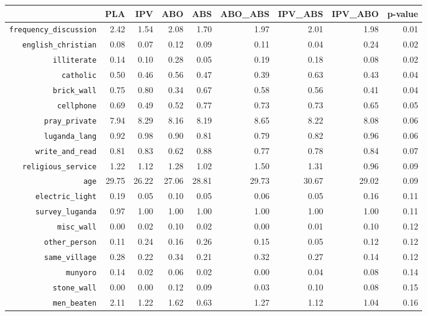 \begin{longtable}{rrrrrrrrr}
  \hline
 & PLA & IPV & ABO & ABS & ABO\_ABS & IPV\_ABS & IPV\_ABO & p-value \\ 
  \hline
{\texttt{frequency\_discussion}} & 2.42 & 1.54 & 2.08 & 1.70 & 1.97 & 2.01 & 1.98 & 0.01 \\ 
  {\texttt{english\_christian}} & 0.08 & 0.07 & 0.12 & 0.09 & 0.11 & 0.04 & 0.24 & 0.02 \\ 
  {\texttt{illiterate}} & 0.14 & 0.10 & 0.28 & 0.05 & 0.19 & 0.18 & 0.08 & 0.02 \\ 
  {\texttt{catholic}} & 0.50 & 0.46 & 0.56 & 0.47 & 0.39 & 0.63 & 0.43 & 0.04 \\ 
  {\texttt{brick\_wall}} & 0.75 & 0.80 & 0.34 & 0.67 & 0.58 & 0.56 & 0.41 & 0.04 \\ 
  {\texttt{cellphone}} & 0.69 & 0.49 & 0.52 & 0.77 & 0.73 & 0.73 & 0.65 & 0.05 \\ 
  {\texttt{pray\_private}} & 7.94 & 8.29 & 8.16 & 8.19 & 8.65 & 8.22 & 8.08 & 0.06 \\ 
  {\texttt{luganda\_lang}} & 0.92 & 0.98 & 0.90 & 0.81 & 0.79 & 0.82 & 0.96 & 0.06 \\ 
  {\texttt{write\_and\_read}} & 0.81 & 0.83 & 0.62 & 0.88 & 0.77 & 0.78 & 0.84 & 0.07 \\ 
  {\texttt{religious\_service}} & 1.22 & 1.12 & 1.28 & 1.02 & 1.50 & 1.31 & 0.96 & 0.09 \\ 
  {\texttt{age}} & 29.75 & 26.22 & 27.06 & 28.81 & 29.73 & 30.67 & 29.02 & 0.09 \\ 
  {\texttt{electric\_light}} & 0.19 & 0.05 & 0.10 & 0.05 & 0.06 & 0.05 & 0.16 & 0.11 \\ 
  {\texttt{survey\_luganda}} & 0.97 & 1.00 & 1.00 & 1.00 & 1.00 & 1.00 & 1.00 & 0.11 \\ 
  {\texttt{misc\_wall}} & 0.00 & 0.02 & 0.10 & 0.02 & 0.00 & 0.01 & 0.10 & 0.12 \\ 
  {\texttt{other\_person}} & 0.11 & 0.24 & 0.16 & 0.26 & 0.15 & 0.05 & 0.12 & 0.12 \\ 
  {\texttt{same\_village}} & 0.28 & 0.22 & 0.34 & 0.21 & 0.32 & 0.27 & 0.14 & 0.12 \\ 
  {\texttt{munyoro}} & 0.14 & 0.02 & 0.06 & 0.02 & 0.00 & 0.04 & 0.08 & 0.14 \\ 
  {\texttt{stone\_wall}} & 0.00 & 0.00 & 0.12 & 0.09 & 0.03 & 0.10 & 0.08 & 0.15 \\ 
  {\texttt{men\_beaten}} & 2.11 & 1.22 & 1.62 & 0.63 & 1.27 & 1.12 & 1.04 & 0.16 \\ 

\end{longtable}
